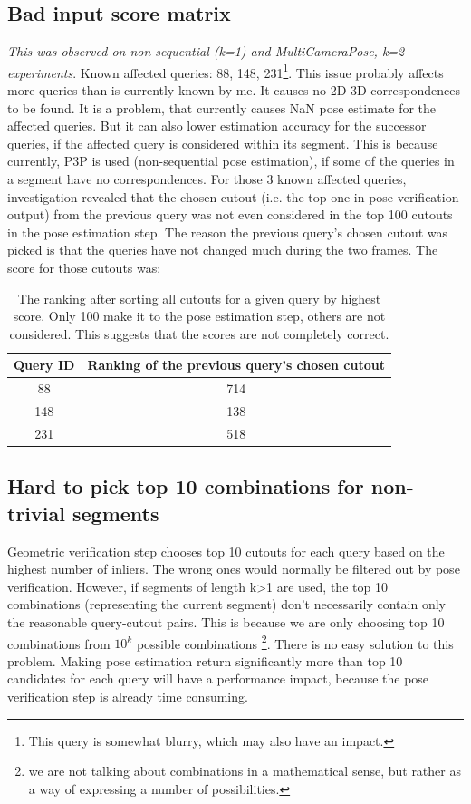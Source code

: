 \documentclass[twoside]{ctuthesis}
\theoremstyle{plain}
\theoremstyle{definition}
\theoremstyle{note}
\newcommand{\topRetrieval}{100} %
\newcommand{\topGV}{10} %
\newcommand{\topPE}{10} %
\begin{document}
\subsection{Bad input score matrix}
\emph{This was observed on non-sequential (k=1) and MultiCameraPose, k=2 experiments}. Known affected queries: 88, 148, 231\footnote{This query is somewhat blurry, which may also have an impact.}. This issue probably affects more queries than is currently known by me. It causes no 2D-3D correspondences to be found. It is a problem, that currently causes NaN pose estimate for the affected queries. But it can also lower estimation accuracy for the successor queries, if the affected query is considered within its segment. This is because currently, P3P is used (non-sequential pose estimation), if some of the queries in a segment have no correspondences. For those 3 known affected queries, investigation revealed that the chosen cutout (i.e. the top one in pose verification output) from the previous query was not even considered in the top \topRetrieval{} cutouts in the pose estimation step. The reason the previous query's chosen cutout was picked is that the queries have not changed much during the two frames. The score for those cutouts was:

\begin{table}[htb!]
	\centering
	\begin{tabular}{|c|c|}
		\hline
		Query ID & Ranking of the previous query's chosen cutout \\
		\hline
		88 & 714 \\
		\hline
		148 & 138 \\
		\hline
		231 & 518 \\
		\hline
	\end{tabular}
	\caption{The ranking after sorting all cutouts for a given query by highest score. Only \topRetrieval{} make it to the pose estimation step, others are not considered. This suggests that the scores are not completely correct.}
	\label{tab:bad-scores-wrong-candidates}
\end{table}

\subsection{Hard to pick top \topPE{} combinations for non-trivial segments}
\label{subsection:hard-top-pick-top-combinations}
Geometric verification step chooses top \topGV{} cutouts for each query based on the highest number of inliers. The wrong ones would normally be filtered out by pose verification. However, if segments of length k>1 are used, the top \topPE{} combinations (representing the current segment) don't necessarily contain only the reasonable query-cutout pairs. This is because we are only choosing top \topPE{} combinations from $\topGV^k$ possible combinations \footnote{we are not talking about combinations in a mathematical sense, but rather as a way of expressing a number of possibilities.}. There is no easy solution to this problem. Making pose estimation return significantly more than top \topPE{} candidates for each query will have a performance impact, because the pose verification step is already time consuming.
\end{document}
